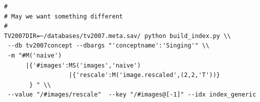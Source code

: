 \documentclass{report}
\begin{document}
\begin{lstlisting}
#
# May we want something different
#
TV2007DIR=~/databases/tv2007.meta.sav/ python build_index.py \\
 --db tv2007concept --dbargs "'conceptname':'Singing'" \\
 -m "#M('naive')
      |{'#images':MS('images','naive')
                  |{'rescale':M('image.rescaled',(2,2,'T'))}
       } " \\
 --value "/#images/rescale"  --key "/#images@[-1]" --idx index_generic

\end{lstlisting}
\end{document}
